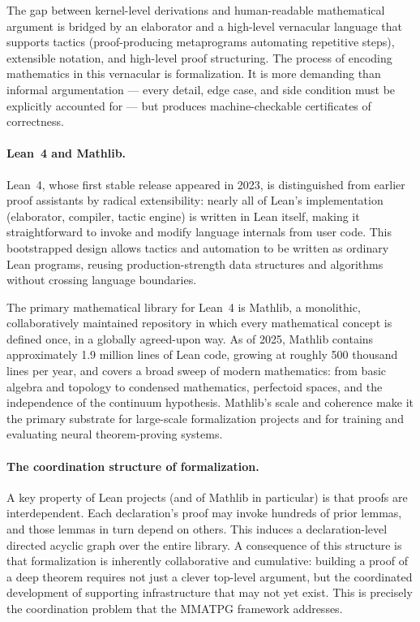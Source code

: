 The gap between kernel-level derivations and human-readable mathematical argument is bridged by an elaborator and a high-level vernacular language that supports tactics (proof-producing metaprograms automating repetitive steps), extensible notation, and high-level proof structuring. The process of encoding mathematics in this vernacular is formalization. It is more demanding than informal argumentation --- every detail, edge case, and side condition must be explicitly accounted for --- but produces machine-checkable certificates of correctness.

\paragraph{Lean~4 and Mathlib.}
Lean~4, whose first stable release appeared in 2023, is distinguished from earlier proof assistants by radical extensibility: nearly all of Lean's implementation (elaborator, compiler, tactic engine) is written in Lean itself, making it straightforward to invoke and modify language internals from user code. This bootstrapped design allows tactics and automation to be written as ordinary Lean programs, reusing production-strength data structures and algorithms without crossing language boundaries.

The primary mathematical library for Lean~4 is Mathlib, a monolithic, collaboratively maintained repository in which every mathematical concept is defined once, in a globally agreed-upon way. As of 2025, Mathlib contains approximately 1.9 million lines of Lean code, growing at roughly 500 thousand lines per year, and covers a broad sweep of modern mathematics: from basic algebra and topology to condensed mathematics, perfectoid spaces, and the independence of the continuum hypothesis. Mathlib's scale and coherence make it the primary substrate for large-scale formalization projects and for training and evaluating neural theorem-proving systems.

\paragraph{The coordination structure of formalization.}
A key property of Lean projects (and of Mathlib in particular) is that proofs are interdependent. Each declaration's proof may invoke hundreds of prior lemmas, and those lemmas in turn depend on others. This induces a declaration-level directed acyclic graph over the entire library. A consequence of this structure is that formalization is inherently collaborative and cumulative: building a proof of a deep theorem requires not just a clever top-level argument, but the coordinated development of supporting infrastructure that may not yet exist. This is precisely the coordination problem that the MMATPG framework addresses.

